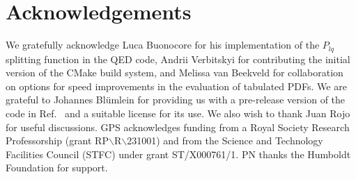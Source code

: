 \documentclass[preprint,1p,a4paper,11pt]{elsarticle}
\begin{document}
\section*{Acknowledgements}


We gratefully acknowledge Luca Buonocore for his
implementation of the $P_{lq}$ splitting function in the QED code,
Andrii Verbitskyi for contributing the initial version of the CMake
build system,
%
and Melissa van Beekveld for collaboration on options for speed
improvements in the evaluation of tabulated PDFs.
%
We are grateful to Johannes Bl\"umlein for providing us with a
pre-release version of the code in Ref.~\cite{BlumleinCode} and a
suitable license for its use.
%
We also wish to thank Juan Rojo for useful discussions. 
%
GPS acknowledges funding from a Royal Society Research
Professorship (grant RP$\backslash$R$\backslash$231001) and from the Science and
Technology Facilities Council (STFC) under grant ST/X000761/1.
%
PN thanks the Humboldt Foundation for support. 
%
\appendix





%
\end{document}
